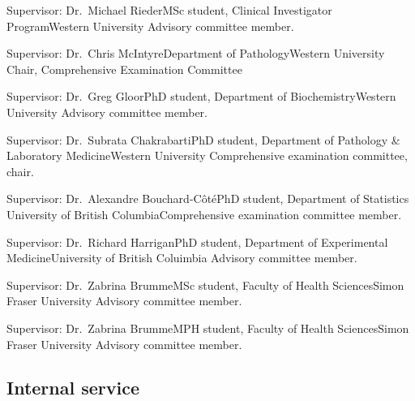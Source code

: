 {Supervisor: Dr.~Michael Rieder}{MSc student, Clinical Investigator Program}{Western University}
{Advisory committee member.} 

{Supervisor: Dr.~Chris McIntyre}{Department of Pathology}{Western University}
{Chair, Comprehensive Examination Committee}

{Supervisor: Dr.~Greg Gloor}{PhD student, Department of Biochemistry}{Western University}
{Advisory committee member.}

{Supervisor: Dr.~Subrata Chakrabarti}{PhD student, Department of Pathology \& Laboratory Medicine}{Western University}
{Comprehensive examination committee, chair.}


{Supervisor: Dr.~Alexandre Bouchard-C\^ot\'e}{PhD student, Department of Statistics}
{University of British Columbia}{Comprehensive examination committee member.}

{Supervisor: Dr.~Richard Harrigan}{PhD student, Department of Experimental Medicine}{University of British Coluimbia}
{Advisory committee member.}

{Supervisor: Dr.~Zabrina Brumme}{MSc student, Faculty of Health Sciences}{Simon Fraser University}
{Advisory committee member.}

{Supervisor: Dr.~Zabrina Brumme}{MPH student, Faculty of Health Sciences}{Simon Fraser University}
{Advisory committee member.}



\subsection {Internal service}





